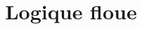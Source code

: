 \documentclass[a4paper,11pt]{article}
\title{Logique floue}
\author{}
\begin{document}
\maketitle
\tableofcontents

\begin{abstract}
\end{abstract}

\section{}
\end{document}
